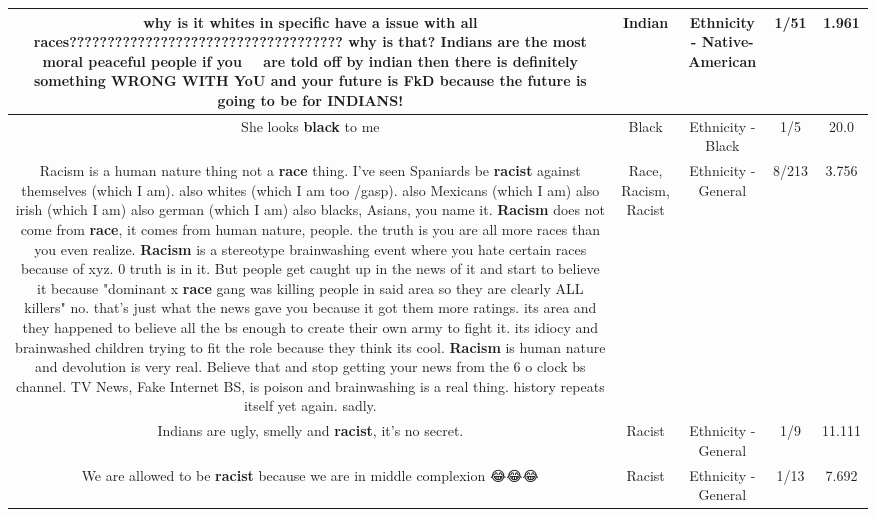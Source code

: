 \documentclass[11pt]{article}
\newlength\mylength
\begin{document}
\begin{center}
\begin{longtable}{|C{.65\mylength}|C{.30\mylength}|C{.12\mylength}|C{.12\mylength}|C{.12\mylength}|}
  \small why is it whites in specific have a issue with all races???????????????????????????????????? why is that? Indians are the most moral peaceful people if you   are told off by \textbf{indian} then there is definitely something WRONG WITH YoU and your future is FkD because the future is going to be for INDIANS!\normalsize   & Indian & Ethnicity - Native-American & 1/51 & 1.961 \\  \hline
  \small She looks \textbf{black} to me\normalsize   & Black & Ethnicity - Black & 1/5 & 20.0 \\  \hline
  \small Racism is a human nature thing not a \textbf{race} thing. I've seen Spaniards be \textbf{racist} against themselves (which I am). also whites (which I am too /gasp). also Mexicans (which I am) also irish (which I am) also german (which I am) also blacks, Asians, you name it. \textbf{Racism} does not come from \textbf{race}, it comes from human nature, people. the truth is you are all more races than you even realize. \textbf{Racism} is a stereotype brainwashing event where you hate certain races because of xyz. 0 truth is in it. But people get caught up in the news of it and start to believe it because "dominant x \textbf{race} gang was killing people in said area so they are clearly ALL killers" no. that's just what the news gave you because it got them more ratings. its area and they happened to believe all the bs enough to create their own army to fight it. its idiocy and brainwashed children trying to fit the role because they think its cool. \textbf{Racism} is human nature and devolution is very real. Believe that and stop getting your news from the 6 o clock bs channel. TV News, Fake Internet BS, is poison and brainwashing is a real thing. history repeats itself yet again. sadly.\normalsize   & Race, Racism, Racist & Ethnicity - General & 8/213 & 3.756 \\  \hline
  \small Indians are ugly, smelly and \textbf{racist}, it's no secret.\normalsize   & Racist & Ethnicity - General & 1/9 & 11.111 \\  \hline
  \small We are allowed to be \textbf{racist} because we are in middle complexion 😂😂😂\normalsize   & Racist & Ethnicity - General & 1/13 & 7.692 \\  \hline

\end{longtable}
\end{center}
\end{document}
